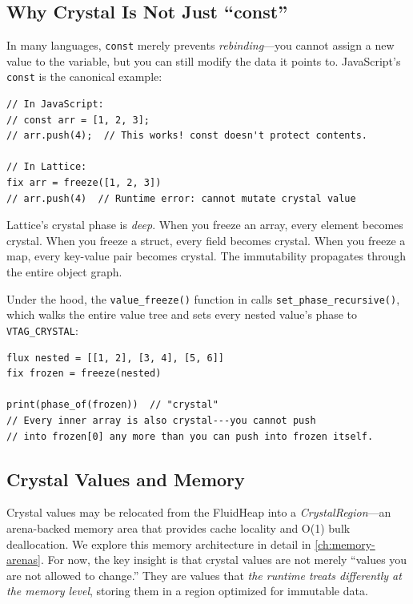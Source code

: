 \subsection{Why Crystal Is Not Just ``const''}

In many languages, \lstinline|const| merely prevents \emph{rebinding}---you cannot assign a new value to the variable, but you can still modify the data it points to.
JavaScript's \lstinline|const| is the canonical example:

\begin{lstlisting}[language=Lattice, caption={The problem with shallow const (JavaScript-style)}]
// In JavaScript:
// const arr = [1, 2, 3];
// arr.push(4);  // This works! const doesn't protect contents.

// In Lattice:
fix arr = freeze([1, 2, 3])
// arr.push(4)  // Runtime error: cannot mutate crystal value
\end{lstlisting}

Lattice's crystal phase is \emph{deep}.
When you freeze an array, every element becomes crystal.
When you freeze a struct, every field becomes crystal.
When you freeze a map, every key-value pair becomes crystal.
The immutability propagates through the entire object graph.

Under the hood, the \lstinline|value_freeze()| function in  calls \lstinline|set_phase_recursive()|, which walks the entire value tree and sets every nested value's phase to \lstinline|VTAG_CRYSTAL|:

\begin{lstlisting}[language=Lattice, caption={Deep freeze in action}]
flux nested = [[1, 2], [3, 4], [5, 6]]
fix frozen = freeze(nested)

print(phase_of(frozen))  // "crystal"
// Every inner array is also crystal---you cannot push
// into frozen[0] any more than you can push into frozen itself.
\end{lstlisting}

\subsection{Crystal Values and Memory}

Crystal values may be relocated from the FluidHeap into a \emph{CrystalRegion}---an arena-backed memory area that provides cache locality and O(1) bulk deallocation.
We explore this memory architecture in detail in \cref{ch:memory-arenas}.
For now, the key insight is that crystal values are not merely ``values you are not allowed to change.''
They are values that \emph{the runtime treats differently at the memory level}, storing them in a region optimized for immutable data.

